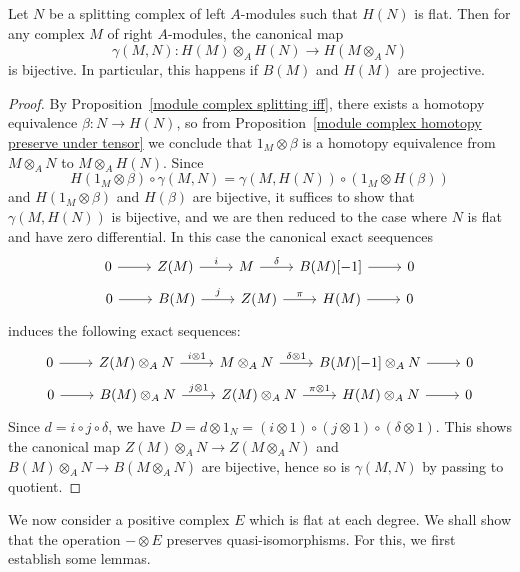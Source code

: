 \begin{corollary}\label{module complex splitting homology exact tensor preserve homology}
Let $N$ be a splitting complex of left $A$-modules such that $H(N)$ is flat. Then for any complex $M$ of right $A$-modules, the canonical map
\[\gamma(M,N):H(M)\otimes_AH(N)\to H(M\otimes_AN)\]
is bijective. In particular, this happens if $B(M)$ and $H(M)$ are projective.
\end{corollary}
\begin{proof}
By Proposition~\ref{module complex splitting iff}, there exists a homotopy equivalence $\beta:N\to H(N)$, so from Proposition~\ref{module complex homotopy preserve under tensor} we conclude that $1_M\otimes\beta$ is a homotopy equivalence from $M\otimes_AN$ to $M\otimes_AH(N)$. Since
\[H(1_M\otimes\beta)\circ\gamma(M,N)=\gamma(M,H(N))\circ(1_M\otimes H(\beta))\]
and $H(1_M\otimes\beta)$ and $H(\beta)$ are bijective, it suffices to show that $\gamma(M,H(N))$ is bijective, and we are then reduced to the case where $N$ is flat and have zero differential. In this case the canonical exact seequences
\[\begin{gathered}
\begin{tikzcd}
0\ar[r]&Z(M)\ar[r,"i"]&M\ar[r,"\delta"]&B(M)[-1]\ar[r]&0
\end{tikzcd}\\
\begin{tikzcd}
0\ar[r]&B(M)\ar[r,"j"]&Z(M)\ar[r,"\pi"]&H(M)\ar[r]&0
\end{tikzcd}
\end{gathered}\]
induces the following exact sequences:
\[\begin{gathered}
\begin{tikzcd}
0\ar[r]&Z(M)\otimes_AN\ar[r,"i\otimes 1"]&M\otimes_AN\ar[r,"\delta\otimes 1"]&B(M)[-1]\otimes_AN\ar[r]&0
\end{tikzcd}\\
\begin{tikzcd}
0\ar[r]&B(M)\otimes_AN\ar[r,"j\otimes 1"]&Z(M)\otimes_AN\ar[r,"\pi\otimes 1"]&H(M)\otimes_AN\ar[r]&0
\end{tikzcd}
\end{gathered}\]
Since $d=i\circ j\circ\delta$, we have $D=d\otimes 1_N=(i\otimes 1)\circ(j\otimes 1)\circ(\delta\otimes 1)$. This shows the canonical map $Z(M)\otimes_AN\to Z(M\otimes_AN)$ and $B(M)\otimes_AN\to B(M\otimes_AN)$ are bijective, hence so is $\gamma(M,N)$ by passing to quotient.
\end{proof}
We now consider a positive complex $E$ which is flat at each degree. We shall show that the operation $-\otimes E$ preserves quasi-isomorphisms. For this, we first establish some lemmas.
